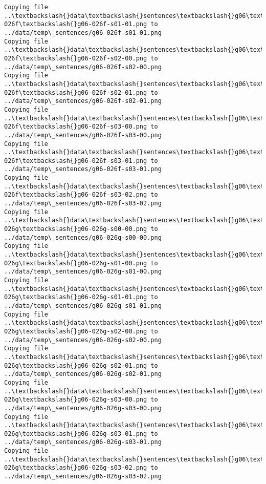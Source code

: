 \documentclass[11pt]{article}
\begin{document}
\begin{Verbatim}[commandchars=\\\{\}]
Copying file ..\textbackslash{}data\textbackslash{}sentences\textbackslash{}g06\textbackslash{}g06-026f\textbackslash{}g06-026f-s01-01.png to
../data/temp\_sentences/g06-026f-s01-01.png
Copying file ..\textbackslash{}data\textbackslash{}sentences\textbackslash{}g06\textbackslash{}g06-026f\textbackslash{}g06-026f-s02-00.png to
../data/temp\_sentences/g06-026f-s02-00.png
Copying file ..\textbackslash{}data\textbackslash{}sentences\textbackslash{}g06\textbackslash{}g06-026f\textbackslash{}g06-026f-s02-01.png to
../data/temp\_sentences/g06-026f-s02-01.png
Copying file ..\textbackslash{}data\textbackslash{}sentences\textbackslash{}g06\textbackslash{}g06-026f\textbackslash{}g06-026f-s03-00.png to
../data/temp\_sentences/g06-026f-s03-00.png
Copying file ..\textbackslash{}data\textbackslash{}sentences\textbackslash{}g06\textbackslash{}g06-026f\textbackslash{}g06-026f-s03-01.png to
../data/temp\_sentences/g06-026f-s03-01.png
Copying file ..\textbackslash{}data\textbackslash{}sentences\textbackslash{}g06\textbackslash{}g06-026f\textbackslash{}g06-026f-s03-02.png to
../data/temp\_sentences/g06-026f-s03-02.png
Copying file ..\textbackslash{}data\textbackslash{}sentences\textbackslash{}g06\textbackslash{}g06-026g\textbackslash{}g06-026g-s00-00.png to
../data/temp\_sentences/g06-026g-s00-00.png
Copying file ..\textbackslash{}data\textbackslash{}sentences\textbackslash{}g06\textbackslash{}g06-026g\textbackslash{}g06-026g-s01-00.png to
../data/temp\_sentences/g06-026g-s01-00.png
Copying file ..\textbackslash{}data\textbackslash{}sentences\textbackslash{}g06\textbackslash{}g06-026g\textbackslash{}g06-026g-s01-01.png to
../data/temp\_sentences/g06-026g-s01-01.png
Copying file ..\textbackslash{}data\textbackslash{}sentences\textbackslash{}g06\textbackslash{}g06-026g\textbackslash{}g06-026g-s02-00.png to
../data/temp\_sentences/g06-026g-s02-00.png
Copying file ..\textbackslash{}data\textbackslash{}sentences\textbackslash{}g06\textbackslash{}g06-026g\textbackslash{}g06-026g-s02-01.png to
../data/temp\_sentences/g06-026g-s02-01.png
Copying file ..\textbackslash{}data\textbackslash{}sentences\textbackslash{}g06\textbackslash{}g06-026g\textbackslash{}g06-026g-s03-00.png to
../data/temp\_sentences/g06-026g-s03-00.png
Copying file ..\textbackslash{}data\textbackslash{}sentences\textbackslash{}g06\textbackslash{}g06-026g\textbackslash{}g06-026g-s03-01.png to
../data/temp\_sentences/g06-026g-s03-01.png
Copying file ..\textbackslash{}data\textbackslash{}sentences\textbackslash{}g06\textbackslash{}g06-026g\textbackslash{}g06-026g-s03-02.png to
../data/temp\_sentences/g06-026g-s03-02.png

\end{Verbatim}
\end{document}
